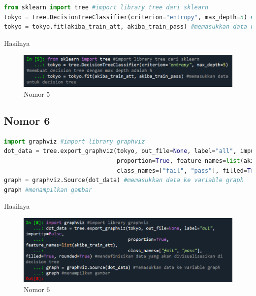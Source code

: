 \begin{lstlisting}[language=Python]
from sklearn import tree #import library tree dari sklearn
tokyo = tree.DecisionTreeClassifier(criterion="entropy", max_depth=5) #membuat decision tree dengan max depth adalah 5
tokyo = tokyo.fit(akiba_train_att, akiba_train_pass) #memasukkan data untuk decision tree
\end{lstlisting}

\par Hasilnya

\begin{figure}[H]
    \centering
    \includegraphics[width=12cm]{figures/chapter2/23.PNG}
    \caption{Nomor 5}
\end{figure}

\subsection{Nomor 6}

\begin{lstlisting}[language=Python]
import graphviz #import library graphviz
dot_data = tree.export_graphviz(tokyo, out_file=None, label="all", impurity=False, 
                                proportion=True, feature_names=list(akiba_train_att), 
                                class_names=["fail", "pass"], filled=True, rounded=True) #mendefinisikan data yang akan divisualisasikan di decision tree
graph = graphviz.Source(dot_data) #memasukkan data ke variable graph
graph #menampilkan gambar
\end{lstlisting}

\par Hasilnya

\begin{figure}[H]
    \centering
    \includegraphics[width=12cm]{figures/chapter2/24.PNG}
    \caption{Nomor 6}
\end{figure}

